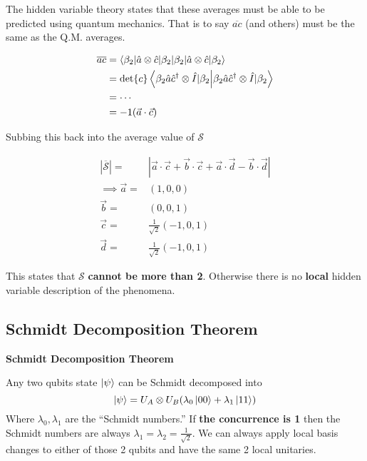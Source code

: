 \documentclass[reprint, amsmath,amssymb, aps]{revtex4-2}
\begin{document}
                    The hidden variable theory states that these averages must be able to be predicted using quantum mechanics. That is to say $\overline{ac}$ (and others) must be the same as the Q.M. averages.

                    \begin{align*}
                    \overline{ac} &= \braket{\beta_2|\hat{a}\otimes\hat{c}|\beta_2} \\
                    &= \det\{c\}\braket{\beta_2 \hat{a}\hat{c}^\dagger\otimes\hat{I}|\beta_2} \\
                    &= \cdots \\
                    &= -1(\vec{a}\cdot \vec{c})
                    \end{align*}

                    Subbing this back into the average value of $\mathscr{S}$

                    \begin{align*}
                        |\overline{\mathscr{S}}| =& |\vec{a}\cdot\vec{c} + \vec{b}\cdot\vec{c}+\vec{a}\cdot\vec{d}-\vec{b}\cdot\vec{d}| \\
                        \implies \vec{a} =& (1,0,0) \\
                        \vec{b} =& (0,0,1) \\
                        \vec{c} =& \frac{1}{\sqrt{2}}(-1,0,1) \\
                        \vec{d} =& \frac{1}{\sqrt{2}}(-1,0, 1)
                    \end{align*}

                    This states that $\mathscr{S}$ \textbf{cannot be more than 2}. Otherwise there is no \textbf{local} hidden variable description of the phenomena.
                    
            \subsection{Schmidt Decomposition Theorem}
                \begin{theorem} \textbf{Schmidt Decomposition Theorem}

                    Any two qubits state $\ket{\psi}$ can be Schmidt decomposed into 
                    \begin{equation*}
                        \ket{\psi} = U_A \otimes U_B (\lambda_0\ket{00} + \lambda_1 \ket{11})
                    \end{equation*}
                    Where $\lambda_0, \lambda_1$ are the ``Schmidt numbers.'' If \textbf{the concurrence is 1} then the Schmidt numbers are always $\lambda_1 = \lambda_2 = \frac{1}{\sqrt{2}}$. We can always apply local basis changes to either of those 2 qubits and have the same 2 local unitaries.
                \end{theorem}
            
\end{document}
